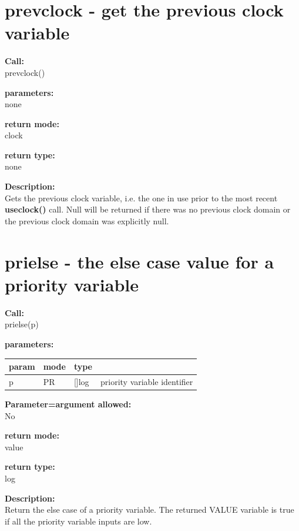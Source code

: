     \section{prevclock - get the previous clock variable}\label{sec:ifprevclock}
        
        {\bf Call:} \\
        prevclock()
        
        {\bf parameters:} \\
        none
        
        {\bf return mode:} \\
        clock

        {\bf return type:} \\
        none
        
        {\bf Description:} \\
        Gets the previous clock variable, i.e. the one in use prior to
        the most recent {\bf useclock()} call. Null will be returned if there
        was no previous clock domain or the previous clock domain was explicitly
        null.
 

    \section{prielse - the else case value for a priority variable}\label{sec:ifprielse}
        
        {\bf Call:} \\
        prielse(p)
        
        {\bf parameters:} \\
        \begin{tabular}{| l | l | l | l |}
        \hline
        param  & mode & type & \\
        \hline \hline
        p & PR & []log & priority variable identifier \\ \hline
        \end{tabular}
        
        {\bf Parameter=argument allowed:} \\
        No
        
        {\bf return mode:} \\
        value

        {\bf return type:} \\
        log
        
        {\bf Description:} \\
        Return the else case of a priority variable. The returned
        VALUE variable is true if all the priority variable inputs
        are low.



